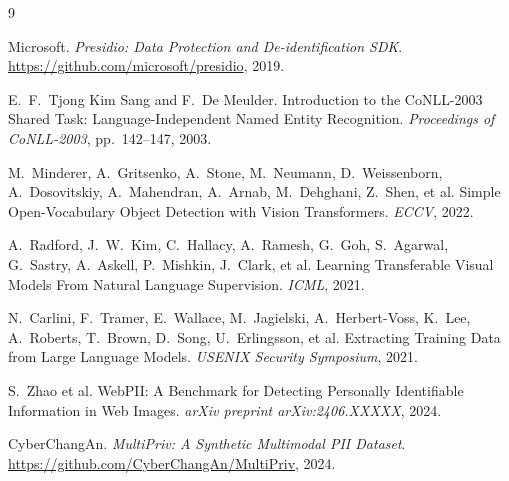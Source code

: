 \documentclass[11pt]{article}
\begin{document}
\begin{thebibliography}{9}

Microsoft. \textit{Presidio: Data Protection and De-identification SDK}.
\url{https://github.com/microsoft/presidio}, 2019.

E.~F.~Tjong Kim Sang and F.~De Meulder.
Introduction to the CoNLL-2003 Shared Task: Language-Independent Named Entity Recognition.
\textit{Proceedings of CoNLL-2003}, pp.~142--147, 2003.

M.~Minderer, A.~Gritsenko, A.~Stone, M.~Neumann, D.~Weissenborn,
A.~Dosovitskiy, A.~Mahendran, A.~Arnab, M.~Dehghani, Z.~Shen, et al.
Simple Open-Vocabulary Object Detection with Vision Transformers.
\textit{ECCV}, 2022.

A.~Radford, J.~W.~Kim, C.~Hallacy, A.~Ramesh, G.~Goh, S.~Agarwal,
G.~Sastry, A.~Askell, P.~Mishkin, J.~Clark, et al.
Learning Transferable Visual Models From Natural Language Supervision.
\textit{ICML}, 2021.

N.~Carlini, F.~Tramer, E.~Wallace, M.~Jagielski, A.~Herbert-Voss, K.~Lee,
A.~Roberts, T.~Brown, D.~Song, U.~Erlingsson, et al.
Extracting Training Data from Large Language Models.
\textit{USENIX Security Symposium}, 2021.

S.~Zhao et al.
WebPII: A Benchmark for Detecting Personally Identifiable Information in Web Images.
\textit{arXiv preprint arXiv:2406.XXXXX}, 2024.

CyberChangAn.
\textit{MultiPriv: A Synthetic Multimodal PII Dataset}.
\url{https://github.com/CyberChangAn/MultiPriv}, 2024.

\end{thebibliography}
\end{document}

